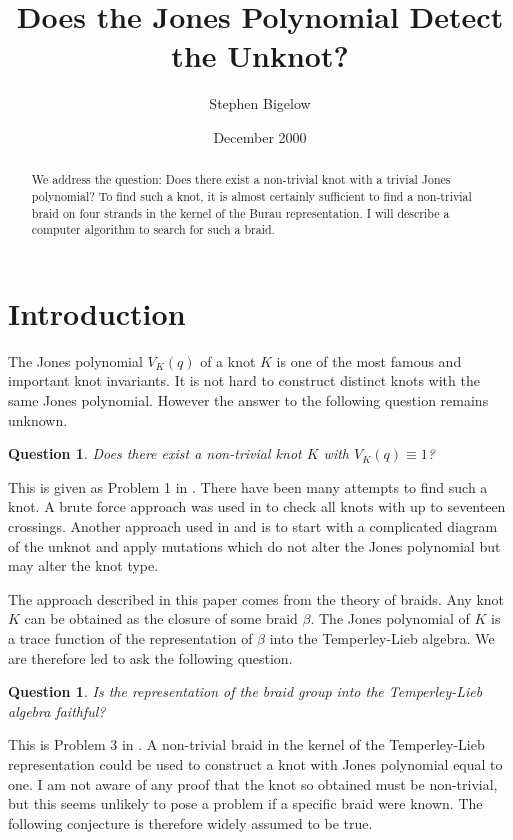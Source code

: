 \documentclass[10pt]{amsart}
\title{Does the Jones Polynomial Detect the Unknot?}
\author{Stephen Bigelow}
\date{December 2000}
\theoremstyle{plain}
\newtheorem{qn}[thm]{Question}
\theoremstyle{definition}
\begin{document}
\begin{abstract}

We address the question: Does there exist a non-trivial knot with
a trivial Jones polynomial? To find such a knot, 
it is almost certainly sufficient 
to find a non-trivial braid on four strands in the kernel of the 
Burau representation. I will describe a computer algorithm to 
search for such a braid.

\end{abstract}
\maketitle
\section{Introduction}
\label{INTRODUCTION}

The Jones polynomial $V_K(q)$ of a knot $K$
is one of the most famous and important knot invariants.
It is not hard to construct
distinct knots with the same Jones polynomial.
However the answer to the following question remains unknown.

\begin{qn}
\label{v=1}
Does there exist a non-trivial knot $K$ with $V_K(q) \equiv 1$?
\end{qn}

This is given as Problem 1 in \cite{jones:problems}.
There have been many attempts to find such a knot.
A brute force approach was used in \cite{dasbach}
to check all knots with up to seventeen crossings.
Another approach used in \cite{apr} and \cite{jones-rolfsen}
is to start with a complicated diagram of the unknot
and apply mutations which do not alter the Jones polynomial
but may alter the knot type.

The approach described in this paper comes from the theory of braids.
Any knot $K$ can be obtained as the closure of some braid $\beta$.
The Jones polynomial of $K$ is a trace function of
the representation of $\beta$ into the Temperley-Lieb algebra.
We are therefore led to ask the following question.

\begin{qn}
Is the representation of the braid group
into the Temperley-Lieb algebra faithful?
\end{qn}

This is Problem 3 in \cite{jones:problems}.
A non-trivial braid in the kernel of the Temperley-Lieb representation
could be used to construct a knot
with Jones polynomial equal to one.
I am not aware of any proof
that the knot so obtained must be non-trivial,
but this seems unlikely to pose a problem
if a specific braid were known.
The following conjecture is therefore widely assumed to be true.
\end{document}
